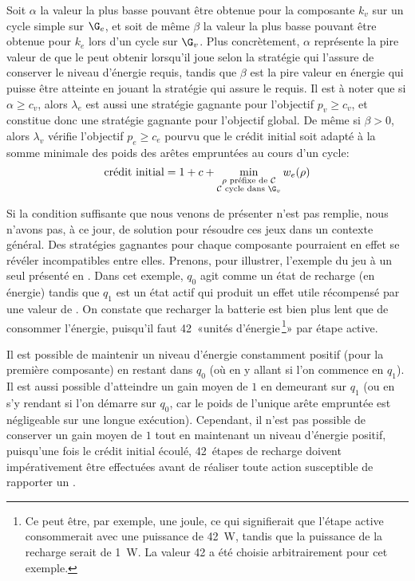 Soit $\alpha$ la valeur la plus basse pouvant être obtenue pour la composante $k_v$ sur un cycle simple sur $\G_e$, et soit de même $\beta$ la valeur la plus basse pouvant être obtenue pour $k_e$ lors d'un cycle sur $\G_v$.
Plus concrètement, $\alpha$ représente la pire valeur de  que le  peut obtenir lorsqu'il joue selon la stratégie qui l'assure de conserver le niveau d'énergie requis, tandis que $\beta$ est la pire valeur en énergie qui puisse être atteinte en jouant la stratégie qui assure le  requis.
Il est à noter que si $\alpha \geq c_v$, alors $\lambda_e$ est aussi une stratégie gagnante pour l'objectif $p_v \geq c_v$, et constitue donc une stratégie gagnante pour l'objectif global.
De même si $\beta > 0$, alors $\lambda_v$ vérifie l'objectif $p_e \geq c_e$ pourvu que le crédit initial soit adapté à la somme minimale des poids des arêtes empruntées au cours d'un cycle:
\[\textrm{crédit initial} = 1+c+\min_{\substack{\rho \textrm{ préfixe de } \mathcal{C}\\
\mathcal{C}\textrm{ cycle dans } \G_v}} w_e(\rho)\]

\medskip

Si la condition suffisante que nous venons de présenter n'est pas remplie, nous n'avons pas, à ce jour, de solution pour résoudre ces jeux dans un contexte général.
Des stratégies gagnantes pour chaque composante pourraient en effet se révéler incompatibles entre elles.
Prenons, pour illustrer, l'exemple du jeu à un seul  présenté en .
Dans cet exemple, $q_0$ agit comme un état de recharge (en énergie) tandis que $q_1$ est un état actif qui produit un effet utile récompensé par une valeur de .
On constate que recharger la batterie est bien plus lent que de consommer l'énergie, puisqu'il faut 42 «unités d'énergie\,\footnote{Ce peut être, par exemple, une joule, ce qui signifierait que l'étape active consommerait avec une puissance de 42~W, tandis que la puissance de la recharge serait de 1~W. La valeur 42 a été choisie arbitrairement pour cet exemple.}» par étape active.

Il est possible de maintenir un niveau d'énergie constamment positif (pour la première composante) en restant dans $q_0$ (où en y allant si l'on commence en $q_1$).
Il est aussi possible d'atteindre un gain moyen de $1$ en demeurant sur $q_1$ (ou en s'y rendant si l'on démarre sur $q_0$, car le poids de l'unique arête empruntée est négligeable sur une longue exécution).
Cependant, il n'est pas possible de conserver un gain moyen de $1$ tout en maintenant un niveau d'énergie positif, puisqu'une fois le crédit initial écoulé, 42~étapes de recharge doivent impérativement être effectuées avant de réaliser toute action susceptible de rapporter un .

